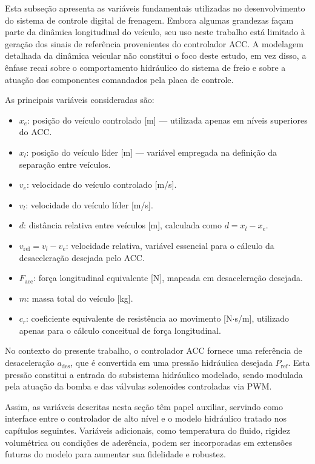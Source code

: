 Esta subseção apresenta as variáveis fundamentais utilizadas no desenvolvimento do sistema de controle digital de frenagem. Embora algumas grandezas façam parte da dinâmica longitudinal do veículo, seu uso neste trabalho está limitado à geração dos sinais de referência provenientes do controlador ACC. A modelagem detalhada da dinâmica veicular não constitui o foco deste estudo, em vez disso, a ênfase recai sobre o comportamento hidráulico do sistema de freio e sobre a atuação dos componentes comandados pela placa de controle.

As principais variáveis consideradas são:

\begin{itemize}
    \item $x_e$: posição do veículo controlado [m] — utilizada apenas em níveis superiores do ACC.
    \item $x_l$: posição do veículo líder [m] — variável empregada na definição da separação entre veículos.
    \item $v_e$: velocidade do veículo controlado [m/s].
    \item $v_l$: velocidade do veículo líder [m/s].
    \item $d$: distância relativa entre veículos [m], calculada como $d = x_l - x_e$.
    \item $v_{\text{rel}} = v_l - v_e$: velocidade relativa, variável essencial para o cálculo da desaceleração desejada pelo ACC.
    \item $F_{\text{acc}}$: força longitudinal equivalente [N], mapeada em desaceleração desejada.
    \item $m$: massa total do veículo [kg].
    \item $c_r$: coeficiente equivalente de resistência ao movimento [N$\cdot$s/m], utilizado apenas para o cálculo conceitual de força longitudinal.
\end{itemize}

No contexto do presente trabalho, o controlador ACC fornece uma referência de desaceleração $a_{\text{des}}$, que é convertida em uma pressão hidráulica desejada $P_{\text{ref}}$. Esta pressão constitui a entrada do subsistema hidráulico modelado, sendo modulada pela atuação da bomba e das válvulas solenoides controladas via PWM. 

Assim, as variáveis descritas nesta seção têm papel auxiliar, servindo como interface entre o controlador de alto nível e o modelo hidráulico tratado nos capítulos seguintes. Variáveis adicionais, como temperatura do fluido, rigidez volumétrica ou condições de aderência, podem ser incorporadas em extensões futuras do modelo para aumentar sua fidelidade e robustez.

